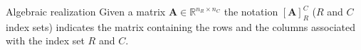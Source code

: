 \documentclass[aspectratio=169]{beamer}
\newcommand{\bbR}{\mathbb{R}}
\begin{document}
\begin{frame}{Algebraic realization}
	Given a matrix $\mathbf{A} \in \bbR^{n_R \times n_C}$ the notation $[\mathbf{A}]_{R}^C$ ($R$ and $C$ index sets) indicates the matrix containing the rows and the columns associated with the index set $R$  and $C$.
	
\end{frame}
\end{document}
